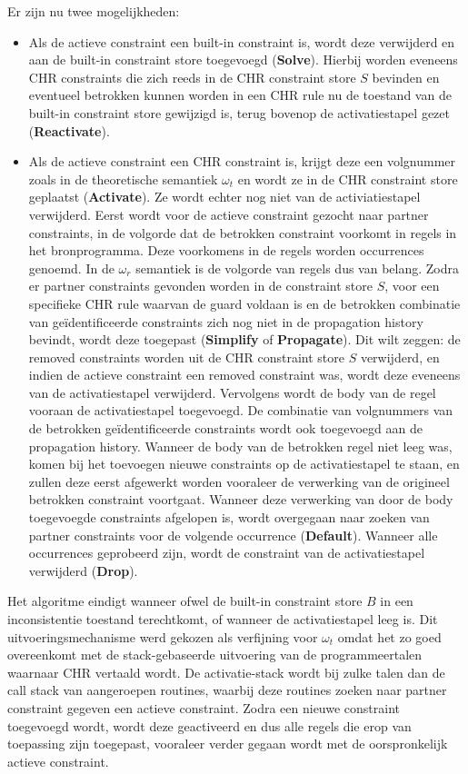 Er zijn nu twee mogelijkheden: \begin{itemize}
\item Als de actieve constraint een built-in constraint is, wordt deze verwijderd en aan de built-in constraint store toegevoegd ({\bf Solve}). Hierbij worden eveneens CHR constraints die zich reeds in de CHR constraint store $S$ bevinden en eventueel betrokken kunnen worden in een CHR rule nu de toestand van de built-in constraint store gewijzigd is, terug bovenop de activatiestapel gezet ({\bf Reactivate}).
\item Als de actieve constraint een CHR constraint is, krijgt deze een volgnummer zoals in de theoretische semantiek $\omega_t$ en wordt ze in de CHR constraint store geplaatst ({\bf Activate}). Ze wordt echter nog niet van de activiatiestapel verwijderd. Eerst wordt voor de actieve constraint gezocht naar partner constraints, in de volgorde dat de betrokken constraint voorkomt in regels in het bronprogramma. Deze voorkomens in de regels worden occurrences genoemd. In de $\omega_r$ semantiek is de volgorde van regels dus van belang. Zodra er partner constraints gevonden worden in de constraint store $S$, voor een specifieke CHR rule waarvan de guard voldaan is en de betrokken combinatie van ge\"identificeerde constraints zich nog niet in de propagation history bevindt, wordt deze toegepast ({\bf Simplify} of {\bf Propagate}). Dit wilt zeggen: de removed constraints worden uit de CHR constraint store $S$ verwijderd, en indien de actieve constraint een removed constraint was, wordt deze eveneens van de activatiestapel verwijderd. Vervolgens wordt de body van de regel vooraan de activatiestapel toegevoegd. De combinatie van volgnummers van de betrokken ge\"identificeerde constraints wordt ook toegevoegd aan de propagation history. Wanneer de body van de betrokken regel niet leeg was, komen bij het toevoegen nieuwe constraints op de activatiestapel te staan, en zullen deze eerst afgewerkt worden vooraleer de verwerking van de origineel betrokken constraint voortgaat. Wanneer deze verwerking van door de body toegevoegde constraints afgelopen is, wordt overgegaan naar zoeken van partner constraints voor de volgende occurrence ({\bf Default}). Wanneer alle occurrences geprobeerd zijn, wordt de constraint van de activatiestapel verwijderd ({\bf Drop}).
\end{itemize}
Het algoritme eindigt wanneer ofwel de built-in constraint store $B$ in een inconsistentie toestand terechtkomt, of wanneer de activatiestapel leeg is. Dit uitvoeringsmechanisme werd gekozen als verfijning voor $\omega_t$ omdat het zo goed overeenkomt met de stack-gebaseerde uitvoering van de programmeertalen waarnaar CHR vertaald wordt. De activatie-stack wordt bij zulke talen dan de call stack van aangeroepen routines, waarbij deze routines zoeken naar partner constraint gegeven een actieve constraint. Zodra een nieuwe constraint toegevoegd wordt, wordt deze geactiveerd en dus alle regels die erop van toepassing zijn toegepast, vooraleer verder gegaan wordt met de oorspronkelijk actieve constraint.


